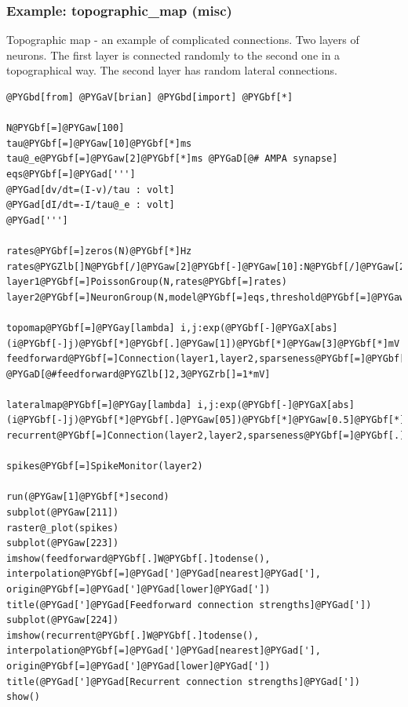 \documentclass[letterpaper,10pt,english]{manual}
\begin{document}
\resetcurrentobjects
\hypertarget{--doc-examples-misc_topographic_map}{}

\hypertarget{index-86}{}\subsubsection{Example: topographic\_map (misc)}

Topographic map - an example of complicated connections.
Two layers of neurons.
The first layer is connected randomly to the second one in a
topographical way.
The second layer has random lateral connections.

\begin{Verbatim}[commandchars=@\[\]]
@PYGbd[from] @PYGaV[brian] @PYGbd[import] @PYGbf[*]

N@PYGbf[=]@PYGaw[100]
tau@PYGbf[=]@PYGaw[10]@PYGbf[*]ms
tau@_e@PYGbf[=]@PYGaw[2]@PYGbf[*]ms @PYGaD[@# AMPA synapse]
eqs@PYGbf[=]@PYGad[''']
@PYGad[dv/dt=(I-v)/tau : volt]
@PYGad[dI/dt=-I/tau@_e : volt]
@PYGad[''']

rates@PYGbf[=]zeros(N)@PYGbf[*]Hz
rates@PYGZlb[]N@PYGbf[/]@PYGaw[2]@PYGbf[-]@PYGaw[10]:N@PYGbf[/]@PYGaw[2]@PYGbf[+]@PYGaw[10]@PYGZrb[]@PYGbf[=]ones(@PYGaw[20])@PYGbf[*]@PYGaw[30]@PYGbf[*]Hz
layer1@PYGbf[=]PoissonGroup(N,rates@PYGbf[=]rates)
layer2@PYGbf[=]NeuronGroup(N,model@PYGbf[=]eqs,threshold@PYGbf[=]@PYGaw[10]@PYGbf[*]mV,reset@PYGbf[=]@PYGaw[0]@PYGbf[*]mV)

topomap@PYGbf[=]@PYGay[lambda] i,j:exp(@PYGbf[-]@PYGaX[abs](i@PYGbf[-]j)@PYGbf[*]@PYGbf[.]@PYGaw[1])@PYGbf[*]@PYGaw[3]@PYGbf[*]mV
feedforward@PYGbf[=]Connection(layer1,layer2,sparseness@PYGbf[=]@PYGbf[.]@PYGaw[5],weight@PYGbf[=]topomap)
@PYGaD[@#feedforward@PYGZlb[]2,3@PYGZrb[]=1*mV]

lateralmap@PYGbf[=]@PYGay[lambda] i,j:exp(@PYGbf[-]@PYGaX[abs](i@PYGbf[-]j)@PYGbf[*]@PYGbf[.]@PYGaw[05])@PYGbf[*]@PYGaw[0.5]@PYGbf[*]mV
recurrent@PYGbf[=]Connection(layer2,layer2,sparseness@PYGbf[=]@PYGbf[.]@PYGaw[5],weight@PYGbf[=]lateralmap)

spikes@PYGbf[=]SpikeMonitor(layer2)

run(@PYGaw[1]@PYGbf[*]second)
subplot(@PYGaw[211])
raster@_plot(spikes)
subplot(@PYGaw[223])
imshow(feedforward@PYGbf[.]W@PYGbf[.]todense(), interpolation@PYGbf[=]@PYGad[']@PYGad[nearest]@PYGad['], origin@PYGbf[=]@PYGad[']@PYGad[lower]@PYGad['])
title(@PYGad[']@PYGad[Feedforward connection strengths]@PYGad['])
subplot(@PYGaw[224])
imshow(recurrent@PYGbf[.]W@PYGbf[.]todense(), interpolation@PYGbf[=]@PYGad[']@PYGad[nearest]@PYGad['], origin@PYGbf[=]@PYGad[']@PYGad[lower]@PYGad['])
title(@PYGad[']@PYGad[Recurrent connection strengths]@PYGad['])
show()
\end{Verbatim}
\end{document}
